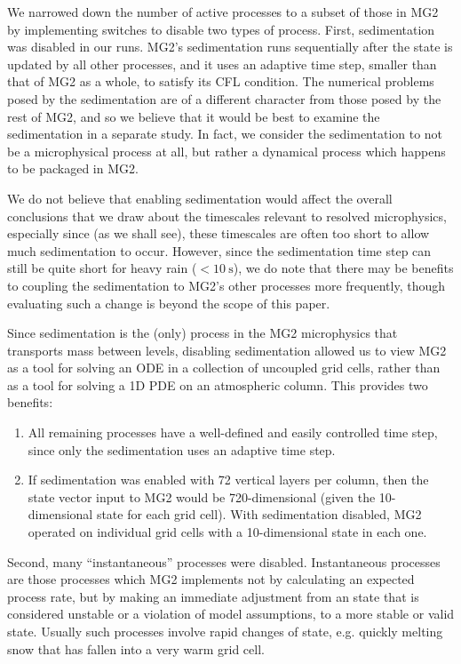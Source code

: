 \documentclass [11pt, proquest] {uwthesis}[2020/02/24]
\begin{document}
We narrowed down the number of active processes to a subset of those in MG2 by implementing switches to disable two types of process. First, sedimentation was disabled in our runs. MG2's sedimentation runs sequentially after the state is updated by all other processes, and it uses an adaptive time step, smaller than that of MG2 as a whole, to satisfy its CFL condition. The numerical problems posed by the sedimentation are of a different character from those posed by the rest of MG2, and so we believe that it would be best to examine the sedimentation in a separate study. In fact, we consider the sedimentation to not be a microphysical process at all, but rather a dynamical process which happens to be packaged in MG2.

We do not believe that enabling sedimentation would affect the overall conclusions that we draw about the timescales relevant to resolved microphysics, especially since (as we shall see), these timescales are often too short to allow much sedimentation to occur. However, since the sedimentation time step can still be quite short for heavy rain ($<\SI{10}{\second}$), we do note that there may be benefits to coupling the sedimentation to MG2's other processes more frequently, though evaluating such a change is beyond the scope of this paper.

Since sedimentation is the (only) process in the MG2 microphysics that transports mass between levels, disabling sedimentation allowed us to view MG2 as a tool for solving an ODE in a collection of uncoupled grid cells, rather than as a tool for solving a 1D PDE on an atmospheric column. This provides two benefits:
\begin{enumerate}
\item All remaining processes have a well-defined and easily controlled time step, since only the sedimentation uses an adaptive time step.
\item If sedimentation was enabled with \num{72} vertical layers per column, then the state vector input to MG2 would be \num{720}-dimensional (given the \num{10}-dimensional state for each grid cell). With sedimentation disabled, MG2 operated on individual grid cells with a \num{10}-dimensional state in each one.
\end{enumerate}

Second, many ``instantaneous'' processes were disabled. Instantaneous processes are those processes which MG2 implements not by calculating an expected process rate, but by making an immediate adjustment from an state that is considered unstable or a violation of model assumptions, to a more stable or valid state. Usually such processes involve rapid changes of state, e.g. quickly melting snow that has fallen into a very warm grid cell.
\end{document}
